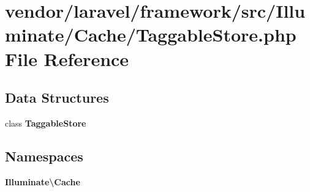 \section{vendor/laravel/framework/src/\+Illuminate/\+Cache/\+Taggable\+Store.php File Reference}
\label{_taggable_store_8php}
\subsection*{Data Structures}
\begin{DoxyCompactItemize}
\item 
class {\bf Taggable\+Store}
\end{DoxyCompactItemize}
\subsection*{Namespaces}
\begin{DoxyCompactItemize}
\item 
 {\bf Illuminate\textbackslash{}\+Cache}
\end{DoxyCompactItemize}
